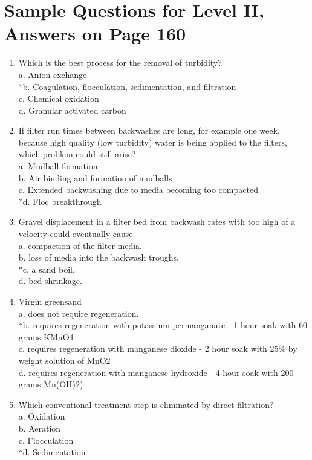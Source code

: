 \section{Sample Questions for Level II, Answers on Page 160}
\begin{enumerate}[label=TII-\arabic*]
\item Which is the best process for the removal of turbidity?\\
a. Anion exchange\\
*b. Coagulation, flocculation, sedimentation, and filtration\\
c. Chemical oxidation\\
d. Granular activated carbon\\
\item If filter run times between backwashes are long, for example one week, because high quality (low turbidity) water is being applied to the filters, which problem could still arise?\\
a. Mudball formation\\
b. Air binding and formation of mudballs\\
c. Extended backwashing due to media becoming too compacted\\
*d. Floc breakthrough \\
\item Gravel displacement in a filter bed from backwash rates with too high of a velocity could eventually cause\\
a. compaction of the filter media.\\
b. loss of media into the backwash troughs.\\
*c. a sand boil.\\
d. bed shrinkage.\\
\item Virgin greensand\\
a. does not require regeneration.\\
*b. requires regeneration with potassium permanganate - 1 hour soak with 60 grams KMnO4\\
c. requires regeneration with manganese dioxide - 2 hour soak with 25\% by weight solution of MnO2\\
d. requires regeneration with manganese hydroxide - 4 hour soak with 200 grams Mn(OH)2)\\
\item Which conventional treatment step is eliminated by direct filtration?\\
a. Oxidation\\
b. Aeration\\
c. Flocculation\\
*d. Sedimentation\\
\end{enumerate}
